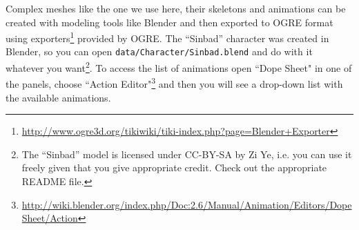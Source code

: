 \documentclass{article}
\begin{document}
Complex meshes like the one we use here, their skeletons and animations can be created with modeling tools like Blender and then exported to OGRE format using exporters\footnote{\url{http://www.ogre3d.org/tikiwiki/tiki-index.php?page=Blender+Exporter}} provided by OGRE. The ``Sinbad'' character was created in Blender, so you can open \verb#data/Character/Sinbad.blend# and do with it whatever you want\footnote{The ``Sinbad'' model is licensed under CC-BY-SA by Zi Ye, i.e. you can use it freely given that you give appropriate credit. Check out the appropriate README file.}. To access the list of animations open ``Dope Sheet" in one of the panels, choose ``Action Editor"\footnote{\url{http://wiki.blender.org/index.php/Doc:2.6/Manual/Animation/Editors/DopeSheet/Action}} and then you will see a drop-down list with the available animations.
\end{document}
